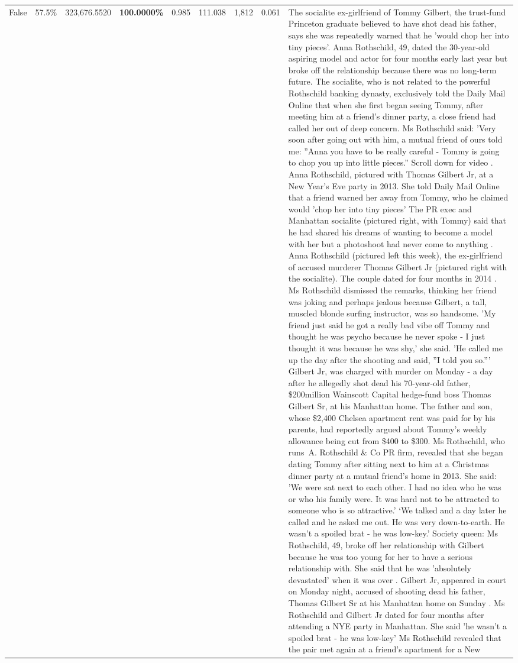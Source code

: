 \begin{table}[H]
\begin{tabular}{lllrlllll}
False & 57.5\% & 323,676.5520 & \bfseries \color{red} 100.0000\% & 0.985 & 111.038 & 1,812 & 0.061 & The socialite ex-girlfriend of Tommy Gilbert, the trust-fund Princeton graduate believed to have shot dead his father, says she was repeatedly warned that he 'would chop her into tiny pieces'. Anna Rothschild, 49, dated the 30-year-old aspiring model and actor for four months early last year but broke off the relationship because there was no long-term future. The socialite, who is not related to the powerful Rothschild banking dynasty, exclusively told the Daily Mail Online that when she first began seeing Tommy, after meeting him at a friend's dinner party, a close friend had called her out of deep concern. Ms Rothschild said: 'Very soon after going out with him, a mutual friend of ours told me: ''Anna you have to be really careful - Tommy is going to chop you up into little pieces.'' Scroll down for video . Anna Rothschild, pictured with Thomas Gilbert Jr, at a New Year's Eve party in 2013. She told Daily Mail Online that a friend warned her away from Tommy, who he claimed would 'chop her into tiny pieces' The PR exec and Manhattan socialite (pictured right, with Tommy) said that he had shared his dreams of wanting to become a model with her but a photoshoot had never come to anything . Anna Rothschild (pictured left this week), the ex-girlfriend of accused murderer Thomas Gilbert Jr (pictured right with the socialite). The couple dated for four months in 2014 . Ms Rothschild dismissed the remarks, thinking her friend was joking and perhaps jealous because Gilbert, a tall, muscled blonde surfing instructor, was so handsome. 'My friend just said he got a really bad vibe off Tommy and thought he was psycho because he never spoke - I just thought it was because he was shy,' she said. 'He called me up the day after the shooting and said, ''I told you so.''' Gilbert Jr, was charged with murder on Monday - a day after he allegedly shot dead his 70-year-old father, \$200million Wainscott Capital hedge-fund boss Thomas Gilbert Sr, at his Manhattan home. The father and son, whose \$2,400 Chelsea apartment rent was paid for by his parents, had reportedly argued about Tommy's weekly allowance being cut from \$400 to \$300. Ms Rothschild, who runs A. Rothschild \& Co PR firm, revealed that she began dating Tommy after sitting next to him at a Christmas dinner party at a mutual friend's home in 2013. She said: 'We were sat next to each other. I had no idea who he was or who his family were. It was hard not to be attracted to someone who is so attractive.' ‘We talked and a day later he called and he asked me out. He was very down-to-earth. He wasn’t a spoiled brat - he was low-key.’ Society queen: Ms Rothschild, 49, broke off her relationship with Gilbert because he was too young for her to have a serious relationship with. She said that he was 'absolutely devastated' when it was over . Gilbert Jr, appeared in court on Monday night, accused of shooting dead his father, Thomas Gilbert Sr at his Manhattan home on Sunday . Ms Rothschild and Gilbert Jr dated for four months after attending a NYE party in Manhattan. She said 'he wasn't a spoiled brat - he was low-key' Ms Rothschild revealed that the pair met again at a friend’s apartment for a New 
\end{tabular}
\end{table}
